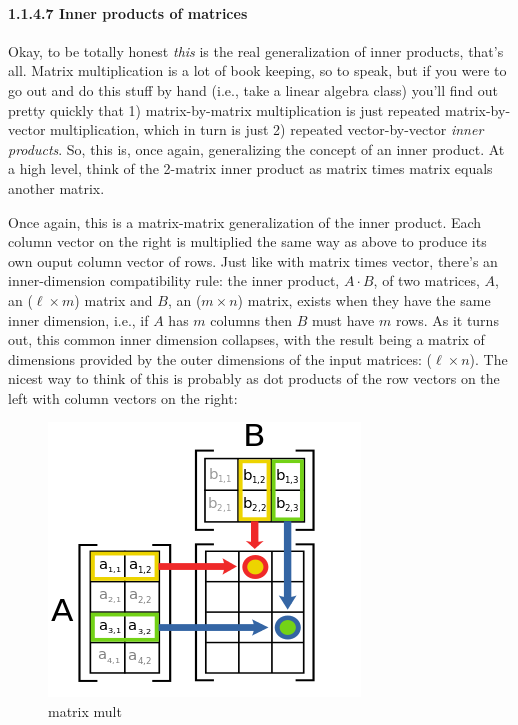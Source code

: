 \documentclass[11pt]{article}
\makeatletter
\def\maxwidth{\ifdim\Gin@nat@width>\linewidth\linewidth
    \else\Gin@nat@width\fi}
\let\Oldincludegraphics\includegraphics
\renewcommand{\includegraphics}[1]{\Oldincludegraphics[width=.8\maxwidth]{#1}}
\makeatother
\begin{document}
    \hypertarget{inner-products-of-matrices}{%
\paragraph{1.1.4.7 Inner products of
matrices}\label{inner-products-of-matrices}}

Okay, to be totally honest \emph{this} is the real generalization of
inner products, that's all. Matrix multiplication is a lot of book
keeping, so to speak, but if you were to go out and do this stuff by
hand (i.e., take a linear algebra class) you'll find out pretty quickly
that 1) matrix-by-matrix multiplication is just repeated
matrix-by-vector multiplication, which in turn is just 2) repeated
vector-by-vector \emph{inner products}. So, this is, once again,
generalizing the concept of an inner product. At a high level, think of
the 2-matrix inner product as matrix times matrix equals another matrix.

Once again, this is a matrix-matrix generalization of the inner product.
Each column vector on the right is multiplied the same way as above to
produce its own ouput column vector of rows. Just like with matrix times
vector, there's an inner-dimension compatibility rule: the inner
product, \(A\cdot B\), of two matrices, \(A\), an (\(\ell \times m\))
matrix and \(B\), an (\(m \times n\)) matrix, exists when they have the
same inner dimension, i.e., if \(A\) has \(m\) columns then \(B\) must
have \(m\) rows. As it turns out, this common inner dimension collapses,
with the result being a matrix of dimensions provided by the outer
dimensions of the input matrices: (\(\ell \times n\)). The nicest way to
think of this is probably as dot products of the row vectors on the left
with column vectors on the right:

\begin{figure}
\centering
\includegraphics{images/matrix_mult.png}
\caption{matrix mult}
\end{figure}
\end{document}
